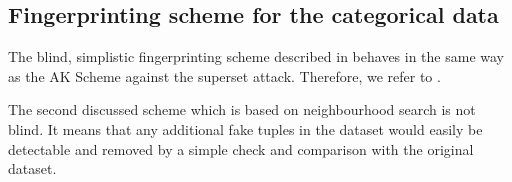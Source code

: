 \subsection{Fingerprinting scheme for the categorical data}
The blind, simplistic fingerprinting scheme described in  behaves in the same way as the AK Scheme against the superset attack. Therefore, we refer to .

The second discussed scheme which is based on neighbourhood search is not blind. It means that any additional fake tuples in the dataset would easily be detectable and removed by a simple check and comparison with the original dataset.
